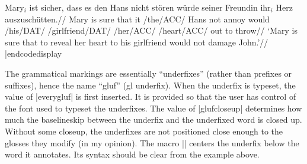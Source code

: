 \codedisplay
\ex[glhangstyle=normal,glufcloseup=.4ex,everygluf=\footnotesize]
\begingl
\gla Mary$_i$ ist sicher, dass es den Hans nicht st\"oren
   w\"urde seiner Freundin ihr$_i$ Herz auszusch\"utten.//
\glb Mary is sure that it \gluf/the/ACC/ Hans not annoy would
   \gluf/his/DAT/ \gluf/girlfriend/DAT/ \gluf/her/ACC/
   \gluf/heart/ACC/ {out to throw}//
\glft `Mary is sure that to reveal her heart to his girlfriend
would not damage John.'//
\endgl
\xe
|endcodedisplay

The grammatical markings are essentially ``underfixes'' (rather than
prefixes or suffixes), hence the name ``gluf'' (gl underfix). When the
underfix is typeset, the value of |everygluf| is first inserted.  It
is provided so that the user has control of the font used to typeset
the underfixes. The value of |glufcloseup| determines how much the
baselineskip between the underfix and the underfixed word is closed
up.  Without some closeup, the underfixes are not positioned close
enough to the glosses they modify (in my opinion). The macro |\gluf|
centers the underfix below the word it annotates.  Its syntax should
be clear from the example above.


